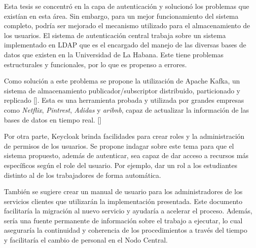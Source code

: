 \begin{recomendations}
	Esta tesis se concentró en la capa de autenticación y solucionó los problemas que existían  en esta área. Sin embargo, para un mejor funcionamiento del sistema completo, podría ser mejorado el mecanismo utilizado para el almacenamiento de los usuarios. El sistema de autenticación central trabaja sobre un sistema implementado en LDAP que es el encargado del manejo de las diversas bases de datos que existen en la Universidad de La Habana. Este tiene problemas estructurales y funcionales, por lo que es propenso a errores. 
    
     Como solución a este problema se propone la utilización de Apache Kafka, un sistema de almacenamiento publicador/subscriptor distribuido, particionado y replicado [\cite{gallegos2015aplicacion}]. Esta es una herramienta probada y utilizada por grandes empresas como \textit{Netflix}, \textit{Pintrest}, \textit{Adidas} y \textit{aribnb}, capaz de actualizar la información de las bases de datos en tiempo real. [\cite{apacheApacheKafka}]
     
Por otra parte, Keycloak brinda facilidades para crear roles y la administración de permisos de los usuarios. Se propone indagar sobre este tema para que el sistema propuesto, además de autenticar, sea capaz de dar acceso a recursos más específicos según el role del usuario. Por ejemplo, dar un rol a los estudiantes distinto al de los trabajadores de forma automática.
     
     También se sugiere crear un manual de usuario para los administradores de los servicios clientes que utilizarán la implementación presentada. Este documento facilitaría la migración al nuevo servicio y ayudaría a acelerar el proceso. Además, sería una fuente permanente de información sobre el trabajo a ejecutar, lo cual aseguraría la continuidad y coherencia de los procedimientos a través del tiempo y facilitaría el cambio de personal en el Nodo Central.
     
     
     
     
\end{recomendations}
